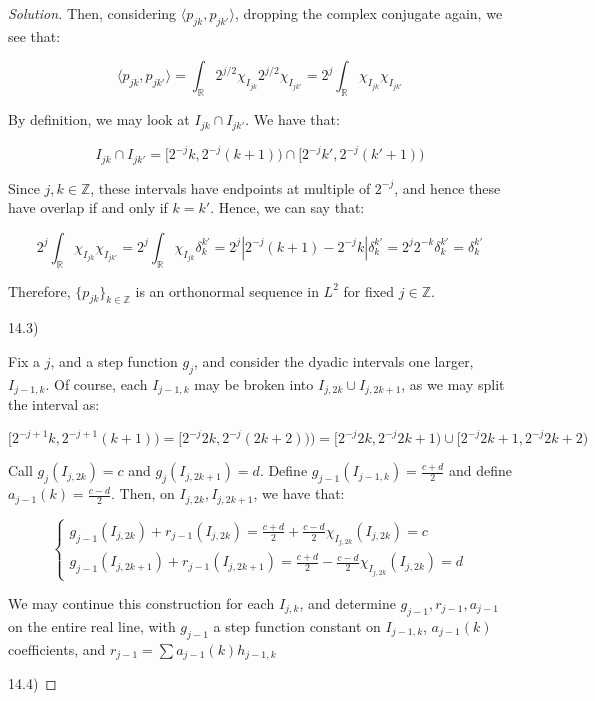 \documentclass[10pt]{article}
\begin{document}
\begin{proof}[Solution]
Then, considering $\langle p_{jk}, p_{jk'} \rangle$, dropping the complex conjugate again, we see that:

$$ \langle p_{jk}, p_{jk'} \rangle = \int_{\mathbb{R}} 2^{j/2}  \chi_{I_{jk}} 2^{j/2}  \chi_{I_{jk'}} = 2^{j} \int_\mathbb{R}  \chi_{I_{jk}}  \chi_{I_{jk'}}$$

By definition, we may look at $I_{jk} \cap I_{jk'}$. We have that:

$$ I_{jk} \cap I_{jk'} =  [2^{-j}k, 2^{-j}(k+1)) \cap  [2^{-j}k', 2^{-j}(k'+1))$$

Since $j, k \in \mathbb{Z}$, these intervals have endpoints at multiple of $2^{-j}$, and hence these have overlap if and only if $k = k'$. Hence, we can say that:

$$ 2^{j} \int_\mathbb{R}  \chi_{I_{jk}}  \chi_{I_{jk'}} = 2^{j} \int_\mathbb{R}  \chi_{I_{jk}}  \delta_k^{k'} = 2^j | 2^{-j}(k+1) - 2^{-j} k| \delta_k^{k'} = 2^j 2^{-k} \delta_k^{k'} = \delta_k^{k'} $$

Therefore, $\{ p_{jk} \}_{k \in \mathbb{Z}}$ is an orthonormal sequence in $L^2$ for fixed $j \in \mathbb{Z}$.

14.3)

Fix a $j$, and a step function $g_j$, and consider the dyadic intervals one larger, $I_{j-1, k}$. Of course, each $I_{j-1,k}$ may be broken into $I_{j,2k} \cup I_{j, 2k+1}$, as we may split the interval as:

$$[2^{-j+1}k, 2^{-j+1}(k+1)) = [2^{-j} 2k, 2^{-j}(2k+2))) = [ 2^{-j} 2k, 2^{-j} 2k + 1) \cup [ 2^{-j} 2k+1, 2^{-j} 2k+2) $$

Call $g_j(I_{j, 2k}) = c$ and $g_j(I_{j, 2k+1}) = d$. Define $g_{j-1}(I_{j-1, k}) = \frac{c+d}{2}$ and define $a_{j-1}(k) = \frac{c - d}{2}$. Then, on $I_{j, 2k},I_{j, 2k+1} $, we have that:

$$ \begin{cases} g_{j-1}(I_{j, 2k}) + r_{j-1}(I_{j, 2k}) = \frac{c + d}{2} + \frac{c - d}{2} \chi_{I_{j, 2k}}(I_{j, 2k}) = c \\ g_{j-1}(I_{j, 2k+1}) + r_{j-1}(I_{j, 2k+1}) = \frac{c + d}{2} - \frac{c - d}{2} \chi_{I_{j, 2k}}(I_{j, 2k}) = d \end{cases} $$

We may continue this construction for each $I_{j, k}$, and determine $g_{j-1}, r_{j-1}, a_{j-1}$ on the entire real line, with $g_{j-1}$ a step function constant on $I_{j-1, k}$, $a_{j-1}(k)$ coefficients, and $r_{j-1} = \sum a_{j-1}(k) h_{j-1, k} $

14.4)


\end{proof}
\end{document}
